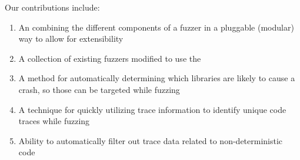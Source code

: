 Our contributions include:
\begin{enumerate}[noitemsep]
\item An \API{} combining the different components of a fuzzer in a pluggable (modular) way to allow for extensibility
\item A collection of existing fuzzers modified to use the \API{}
\item A method for automatically determining which libraries are likely to
	cause a crash, so those can be targeted while fuzzing
\item A technique for quickly utilizing \IPT{} trace information to identify unique code traces while fuzzing
\item Ability to automatically filter out trace data related to non-deterministic code
\end{enumerate}

